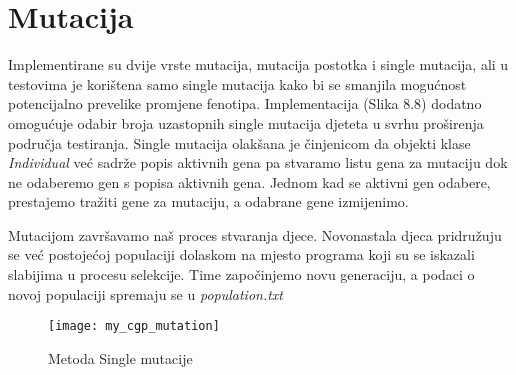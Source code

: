 \section{Mutacija}
\quad Implementirane su dvije vrste mutacija, mutacija postotka i single mutacija, ali u testovima je korištena samo single mutacija kako bi se smanjila mogućnost potencijalno prevelike promjene fenotipa. Implementacija (Slika 8.8) dodatno omogućuje odabir broja uzastopnih single mutacija djeteta u svrhu proširenja područja testiranja. Single mutacija olakšana je činjenicom da objekti klase \textit{Individual} već sadrže popis aktivnih gena pa stvaramo listu gena za mutaciju dok ne odaberemo gen s popisa aktivnih gena. Jednom kad se aktivni gen odabere, prestajemo tražiti gene za mutaciju, a odabrane gene izmijenimo.
\par 
 Mutacijom završavamo naš proces stvaranja djece. Novonastala djeca pridružuju se već postojećoj populaciji dolaskom na mjesto programa koji su se iskazali slabijima u procesu selekcije. Time započinjemo novu generaciju, a podaci o novoj populaciji spremaju se u \textit{population.txt}
 
\begin{figure}[h]
	\centering
	\texttt{[image: my\_cgp\_mutation]}
	\caption{Metoda Single mutacije}
\end{figure}

\newpage
\verb| |